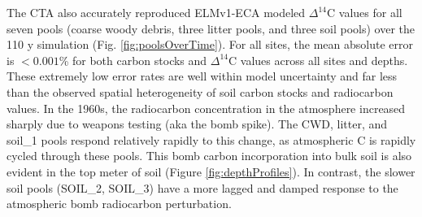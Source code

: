 \documentclass[11pt,a4paper]{article}
\begin{document}
The CTA also accurately reproduced ELMv1-ECA modeled $\Delta^{14}$C values for all seven pools (coarse woody debris, three litter pools, and three soil pools) over the 110 y simulation (Fig. \ref{fig:poolsOverTime}). For all sites, the mean absolute error is $<0.001$\% for both carbon stocks and $\Delta^{14}$C values across all sites and depths. These extremely low error rates are well within model uncertainty and far less than the observed spatial heterogeneity of soil carbon stocks and radiocarbon values. 
In the 1960s, the radiocarbon concentration in the atmosphere increased sharply due to weapons testing (aka the bomb spike). The CWD, litter, and soil\_1 pools respond relatively rapidly to this change, as atmospheric C is rapidly cycled through these pools. This bomb carbon incorporation into bulk soil is also evident in the top meter of soil (Figure \ref{fig:depthProfiles}). In contrast, the slower soil pools (SOIL\_2, SOIL\_3) have a more lagged and damped response to the atmospheric bomb radiocarbon perturbation.
\end{document}

